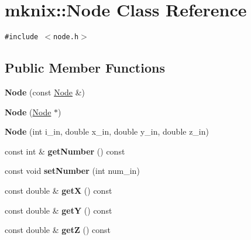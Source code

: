 \hypertarget{classmknix_1_1Node}{
\section{mknix::Node Class Reference}
\label{classmknix_1_1Node}
}
{\tt \#include $<$node.h$>$}

\subsection*{Public Member Functions}
\begin{CompactItemize}
\item 
\hypertarget{classmknix_1_1Node_2e851819b5478c2110bbbd71fec6a3bb}{
\textbf{Node} (const \hyperlink{classmknix_1_1Node}{Node} \&)}
\label{classmknix_1_1Node_2e851819b5478c2110bbbd71fec6a3bb}

\item 
\hypertarget{classmknix_1_1Node_25d1e3213d5db7c7d29d68c00036f4cf}{
\textbf{Node} (\hyperlink{classmknix_1_1Node}{Node} $\ast$)}
\label{classmknix_1_1Node_25d1e3213d5db7c7d29d68c00036f4cf}

\item 
\hypertarget{classmknix_1_1Node_14799609698201dafea7d60684c12708}{
\textbf{Node} (int i\_\-in, double x\_\-in, double y\_\-in, double z\_\-in)}
\label{classmknix_1_1Node_14799609698201dafea7d60684c12708}

\item 
\hypertarget{classmknix_1_1Node_05e294322b5a045037da041beaaff9f8}{
const int \& \textbf{getNumber} () const }
\label{classmknix_1_1Node_05e294322b5a045037da041beaaff9f8}

\item 
\hypertarget{classmknix_1_1Node_6c08fe7fdeb154268c4a0a6e435bc561}{
const void \textbf{setNumber} (int num\_\-in)}
\label{classmknix_1_1Node_6c08fe7fdeb154268c4a0a6e435bc561}

\item 
\hypertarget{classmknix_1_1Node_6957b371020e55b1bfd923c6668f82f4}{
const double \& \textbf{getX} () const }
\label{classmknix_1_1Node_6957b371020e55b1bfd923c6668f82f4}

\item 
\hypertarget{classmknix_1_1Node_b8732885ec1c4849e16b62b387db7cc5}{
const double \& \textbf{getY} () const }
\label{classmknix_1_1Node_b8732885ec1c4849e16b62b387db7cc5}

\item 
\hypertarget{classmknix_1_1Node_5dcc7955b61dba3d498c800fd83900e7}{
const double \& \textbf{getZ} () const }
\label{classmknix_1_1Node_5dcc7955b61dba3d498c800fd83900e7}


\end{CompactItemize}
